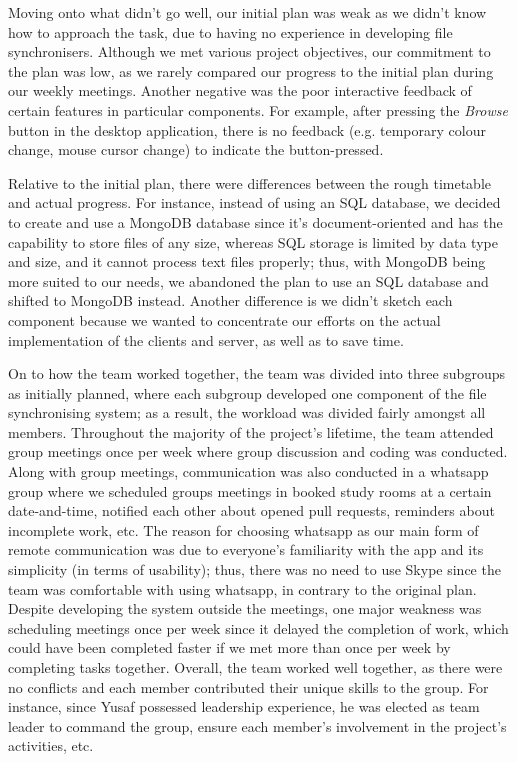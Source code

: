 \documentclass{article}
\begin{document}
\noindent Moving onto what didn't go well, our initial plan was weak as we didn't know how to approach the task, due to having no experience in developing file synchronisers. Although we met various project objectives, our commitment to the plan was low, as we rarely compared our progress to the initial plan during our weekly meetings. Another negative was the poor interactive feedback of certain features in particular components. For example, after pressing the \textit{Browse} button in the desktop application, there is no feedback (e.g. temporary colour change, mouse cursor change) to indicate the button-pressed.

\noindent Relative to the initial plan, there were differences between the rough timetable and actual progress. For instance, instead of using an SQL database, we decided to create and use a MongoDB database since it's document-oriented and has the capability to store files of any size, whereas SQL storage is limited by data type and size, and it cannot process text files properly; thus, with MongoDB being more suited to our needs, we abandoned the plan to use an SQL database and shifted to MongoDB instead. Another difference is we didn't sketch each component because we wanted to concentrate our efforts on the actual implementation of the clients and server, as well as to save time.

\noindent On to how the team worked together, the team was divided into three subgroups as initially planned, where each subgroup developed one component of the file synchronising system; as a result, the workload was divided fairly amongst all members. Throughout the majority of the project's lifetime, the team attended group meetings once per week where group discussion and coding was conducted. Along with group meetings, communication was also conducted in a whatsapp group where we scheduled groups meetings in booked study rooms at a certain date-and-time, notified each other about opened pull requests, reminders about incomplete work, etc. The reason for choosing whatsapp as our main form of remote communication was due to everyone's familiarity with the app and its simplicity (in terms of usability); thus, there was no need to use Skype since the team was comfortable with using whatsapp, in contrary to the original plan. Despite developing the system outside the meetings, one major weakness was scheduling meetings once per week since it delayed the completion of work, which could have been completed faster if we met more than once per week by completing tasks together. Overall, the team worked well together, as there were no conflicts and each member contributed their unique  skills to the group. For instance, since Yusaf possessed leadership experience, he was elected as team leader to command the group, ensure each member's involvement in the project's activities, etc.
\end{document}
